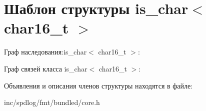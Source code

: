 \hypertarget{structis__char_3_01char16__t_01_4}{}\section{Шаблон структуры is\+\_\+char$<$ char16\+\_\+t $>$}
\label{structis__char_3_01char16__t_01_4}


Граф наследования\+:is\+\_\+char$<$ char16\+\_\+t $>$\+:


Граф связей класса is\+\_\+char$<$ char16\+\_\+t $>$\+:


Объявления и описания членов структуры находятся в файле\+:\begin{DoxyCompactItemize}
\item 
inc/spdlog/fmt/bundled/core.\+h\end{DoxyCompactItemize}
